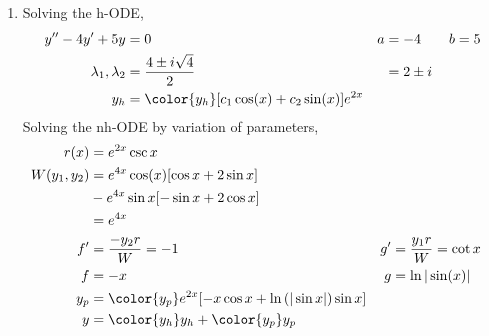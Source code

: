 \begin{enumerate}
    \item Solving the h-ODE,
          \begin{align}
              y'' - 4y' + 5y           & = 0                                                 & a & = -4 \qquad b = 5 \\
              \lambda_{1}, \lambda_{2} & = \frac{4 \pm i\sqrt{4}}{2}                         &   & = 2 \pm i         \\
              y_{h}                    & = {\color{y_h} [c_{1}\cos(x) + c_{2}\sin(x)]e^{2x}}
          \end{align}
          Solving the nh-ODE by variation of parameters,
          \begin{align}
              r(x)            & = e^{2x}\csc x                                                                                          \\
              W(y_{1}, y_{2}) & = e^{4x}\cos(x)[\cos x + 2\sin x]                                                                       \\
                              & - e^{4x}\sin x[-\sin x + 2\cos x]                                                                       \\
                              & = e^{4x}                                                                                                \\
              f'              & = \frac{-y_{2}r}{W} = -1                                             & g' & = \frac{y_{1}r}{W} = \cot x \\
              f               & = -x                                                                 & g  & = \ln|\sin(x)|              \\
              y_{p}           & = {\color{y_p} e^{2x}[-x\cos x + \ln\left( |\sin x| \right) \sin x]}                                    \\
              y               & = {\color{y_h} y_{h}} + {\color{y_p} y_{p}}
          \end{align}


\end{enumerate}
